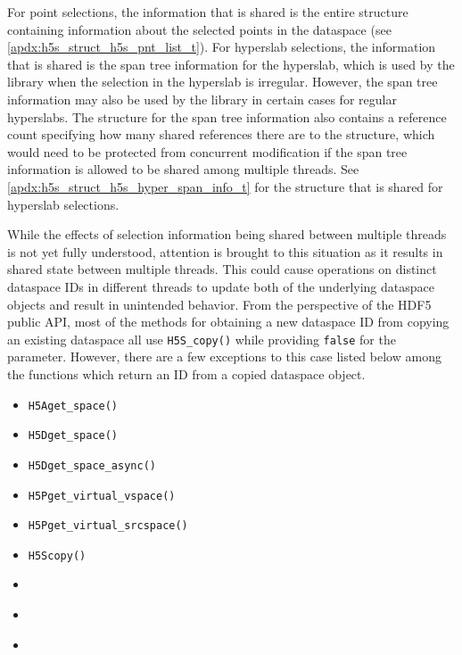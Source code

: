 \documentclass[../HDF5_RFC.tex]{subfiles}
\begin{document}
For point selections, the information that is shared is the entire structure containing
information about the selected points in the dataspace (see \ref{apdx:h5s_struct_h5s_pnt_list_t}).
For hyperslab selections, the information that is shared is the span tree information for
the hyperslab, which is used by the library when the selection in the hyperslab is irregular.
However, the span tree information may also be used by the library in certain cases for
regular hyperslabs. The structure for the span tree information also contains a reference
count specifying how many shared references there are to the structure, which would need to
be protected from concurrent modification if the span tree information is allowed to be shared
among multiple threads. See \ref{apdx:h5s_struct_h5s_hyper_span_info_t} for the structure
that is shared for hyperslab selections.

While the effects of selection information being shared between multiple threads is not yet
fully understood, attention is brought to this situation as it results in shared state between
multiple threads. This could cause operations on distinct dataspace IDs in different threads
to update both of the underlying dataspace objects and result in unintended behavior. From the
perspective of the HDF5 public API, most of the methods for obtaining a new dataspace ID from
copying an existing dataspace all use \texttt{H5S\_copy()} while providing \texttt{false} for
the parameter. However, there are a few exceptions to this case listed below among the functions
which return an ID from a copied dataspace object.

\begin{itemize}
    \item \texttt{H5Aget\_space()}
    \item \texttt{H5Dget\_space()}
    \item \texttt{H5Dget\_space\_async()}
    \item \texttt{H5Pget\_virtual\_vspace()}
    \item \texttt{H5Pget\_virtual\_srcspace()}
    \item \texttt{H5Scopy()}
    \item \textbf{}
    \item \textbf{}
    \item \textbf{}
\end{itemize}
\end{document}

